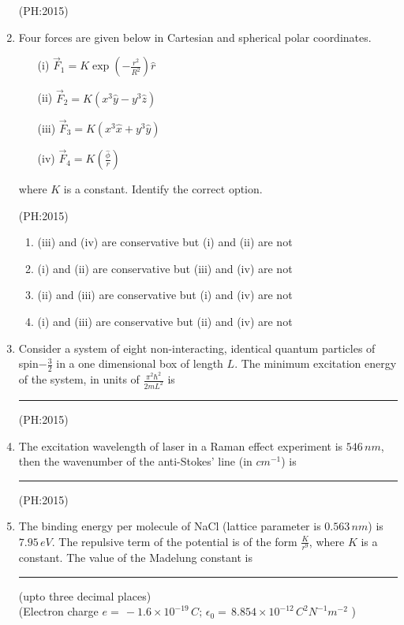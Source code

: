 \documentclass[journal,12pt,onecolumn]{IEEEtran}
\theoremstyle{remark}
\begin{document}
\begin{enumerate}
		\hfill{(PH:2015)}
		\vspace{0.5cm}
	\item
		Four forces are given below in Cartesian and spherical polar coordinates.
\begin{itemize}
    \item[(i)] $\vec{F}_1 = K \exp\left(-\frac{r^2}{R^2}\right) \hat{r}$
    \item[(ii)] $\vec{F}_2 = K ( x^3 \hat{y} - y^3 \hat{z} )$
    \item[(iii)] $\vec{F}_3 = K ( x^3 \hat{x} + y^3 \hat{y} )$
    \item[(iv)] $\vec{F}_4 = K \left( \frac{\hat{\phi}}{r} \right)$
\end{itemize}

where $K$ is a constant. Identify the correct option.

\hfill{(PH:2015)}

\begin{enumerate}
    \item (iii) and (iv) are conservative but (i) and (ii) are not
    \item (i) and (ii) are conservative but (iii) and (iv) are not
    \item (ii) and (iii) are conservative but (i) and (iv) are not
    \item (i) and (iii) are conservative but (ii) and (iv) are not
\end{enumerate}
\item 
	Consider a system of eight non-interacting, identical quantum particles of spin$-\frac{3}{2}$ in a one dimensional box of length $L$. The minimum excitation energy of the system, in units of $\frac{\pi^2 \hbar^2}{2mL^2}$ is \rule{2cm}{0.4pt}

	\hfill{(PH:2015)}
	\vspace{0.5cm}
\item
	The excitation wavelength of laser in a Raman effect experiment is $546 \, nm$, then the wavenumber of the anti-Stokes' line (in $cm^{-1}$) is \rule{2cm}{0.4pt}

	\hfill{(PH:2015)}
	\vspace{0.5cm}
\item
	The binding energy per molecule of NaCl (lattice parameter is $0.563\, nm$) is $7.95\, eV$. The repulsive term of the potential is of the form $\frac{K}{r^9}$, where $K$ is a constant. The value of the Madelung constant is \rule{2cm}{0.4pt} (upto three decimal places)\\
	(Electron charge $e=\, -1.6\times 10^{-19}\, C;\, \epsilon_0 =\, 8.854\times 10^{-12} \, C^2 N^{-1} m^{-2}$  )


\end{enumerate}
\end{document}
